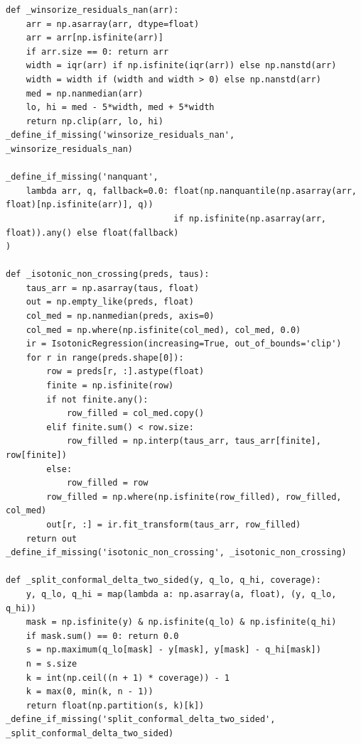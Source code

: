 \documentclass[
  a4paper,
  DIV=11,
  numbers=noendperiod]{scrreprt}
\begin{document}
\begin{verbatim}
def _winsorize_residuals_nan(arr):
    arr = np.asarray(arr, dtype=float)
    arr = arr[np.isfinite(arr)]
    if arr.size == 0: return arr
    width = iqr(arr) if np.isfinite(iqr(arr)) else np.nanstd(arr)
    width = width if (width and width > 0) else np.nanstd(arr)
    med = np.nanmedian(arr)
    lo, hi = med - 5*width, med + 5*width
    return np.clip(arr, lo, hi)
_define_if_missing('winsorize_residuals_nan', _winsorize_residuals_nan)

_define_if_missing('nanquant',
    lambda arr, q, fallback=0.0: float(np.nanquantile(np.asarray(arr, float)[np.isfinite(arr)], q))
                                 if np.isfinite(np.asarray(arr, float)).any() else float(fallback)
)

def _isotonic_non_crossing(preds, taus):
    taus_arr = np.asarray(taus, float)
    out = np.empty_like(preds, float)
    col_med = np.nanmedian(preds, axis=0)
    col_med = np.where(np.isfinite(col_med), col_med, 0.0)
    ir = IsotonicRegression(increasing=True, out_of_bounds='clip')
    for r in range(preds.shape[0]):
        row = preds[r, :].astype(float)
        finite = np.isfinite(row)
        if not finite.any():
            row_filled = col_med.copy()
        elif finite.sum() < row.size:
            row_filled = np.interp(taus_arr, taus_arr[finite], row[finite])
        else:
            row_filled = row
        row_filled = np.where(np.isfinite(row_filled), row_filled, col_med)
        out[r, :] = ir.fit_transform(taus_arr, row_filled)
    return out
_define_if_missing('isotonic_non_crossing', _isotonic_non_crossing)

def _split_conformal_delta_two_sided(y, q_lo, q_hi, coverage):
    y, q_lo, q_hi = map(lambda a: np.asarray(a, float), (y, q_lo, q_hi))
    mask = np.isfinite(y) & np.isfinite(q_lo) & np.isfinite(q_hi)
    if mask.sum() == 0: return 0.0
    s = np.maximum(q_lo[mask] - y[mask], y[mask] - q_hi[mask])
    n = s.size
    k = int(np.ceil((n + 1) * coverage)) - 1
    k = max(0, min(k, n - 1))
    return float(np.partition(s, k)[k])
_define_if_missing('split_conformal_delta_two_sided', _split_conformal_delta_two_sided)


\end{verbatim}
\end{document}
